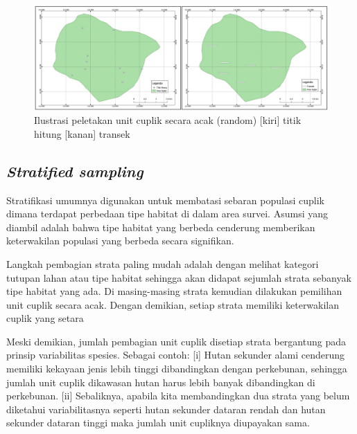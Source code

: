 \documentclass[
  oneside]{book}
\begin{document}
\begin{figure}

{\centering \includegraphics[width=1\linewidth]{images/rsamp} 

}

\caption{Ilustrasi peletakan unit cuplik secara acak (random) [kiri] titik hitung [kanan] transek}\label{fig:sandomsampling}
\end{figure}

\hypertarget{stratified-sampling}{%
\subsection*{\texorpdfstring{\emph{Stratified sampling}}{Stratified sampling}}\label{stratified-sampling}}

Stratifikasi umumnya digunakan untuk membatasi sebaran populasi cuplik dimana terdapat perbedaan tipe habitat di dalam area survei. Asumsi yang diambil adalah bahwa tipe habitat yang berbeda cenderung memberikan keterwakilan populasi yang berbeda secara signifikan.

Langkah pembagian strata paling mudah adalah dengan melihat kategori tutupan lahan atau tipe habitat sehingga akan didapat sejumlah strata sebanyak tipe habitat yang ada. Di masing-masing strata kemudian dilakukan pemilihan unit cuplik secara acak. Dengan demikian, setiap strata memiliki keterwakilan cuplik yang setara

Meski demikian, jumlah pembagian unit cuplik disetiap strata bergantung pada prinsip variabilitas spesies. Sebagai contoh: {[}i{]} Hutan sekunder alami cenderung memiliki kekayaan jenis lebih tinggi dibandingkan dengan perkebunan, sehingga jumlah unit cuplik dikawasan hutan harus lebih banyak dibandingkan di perkebunan. {[}ii{]} Sebaliknya, apabila kita membandingkan dua strata yang belum diketahui variabilitasnya seperti hutan sekunder dataran rendah dan hutan sekunder dataran tinggi maka jumlah unit cupliknya diupayakan sama.
\end{document}
